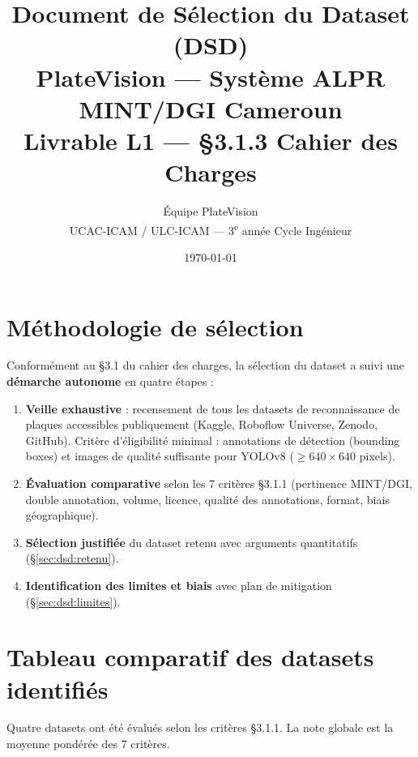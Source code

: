 \documentclass[12pt,a4paper]{article}
\title{\textbf{Document de S\'{e}lection du Dataset (DSD)}\\[0.5em]
\large PlateVision --- Syst\`{e}me ALPR MINT/DGI Cameroun\\[0.3em]
\normalsize Livrable L1 --- §3.1.3 Cahier des Charges}
\author{\'{E}quipe PlateVision\\
UCAC-ICAM / ULC-ICAM --- 3\textsuperscript{e} ann\'{e}e Cycle Ing\'{e}nieur}
\date{\today}
\begin{document}
\maketitle
\tableofcontents
\newpage

\section{M\'{e}thodologie de s\'{e}lection}
\label{sec:dsd:methodo}

Conform\'{e}ment au §3.1 du cahier des charges, la s\'{e}lection du dataset
a suivi une \textbf{d\'{e}marche autonome} en quatre \'{e}tapes :

\begin{enumerate}
  \item \textbf{Veille exhaustive} : recensement de tous les datasets de
        reconnaissance de plaques accessibles publiquement (Kaggle, Roboflow
        Universe, Zenodo, GitHub). Crit\`{e}re d'\'{e}ligibilit\'{e} minimal :
        annotations de d\'{e}tection (bounding boxes) et images de qualit\'{e}
        suffisante pour YOLOv8 ($\geq 640 \times 640$ pixels).

  \item \textbf{\'{E}valuation comparative} selon les 7 crit\`{e}res §3.1.1
        (pertinence MINT/DGI, double annotation, volume, licence, qualit\'{e}
        des annotations, format, biais g\'{e}ographique).

  \item \textbf{S\'{e}lection justifi\'{e}e} du dataset retenu avec arguments
        quantitatifs (§\ref{sec:dsd:retenu}).

  \item \textbf{Identification des limites et biais} avec plan de mitigation
        (§\ref{sec:dsd:limites}).
\end{enumerate}

\section{Tableau comparatif des datasets identifi\'{e}s}
\label{sec:dsd:comparatif}

Quatre datasets ont \'{e}t\'{e} \'{e}valu\'{e}s selon les crit\`{e}res §3.1.1.
La note globale est la moyenne pond\'{e}r\'{e}e des 7 crit\`{e}res.
\end{document}
